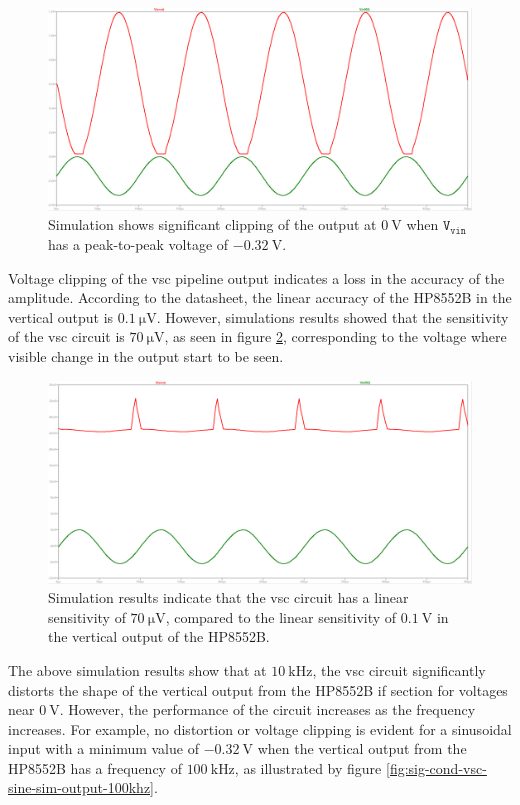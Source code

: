 \documentclass[class=report,11pt,crop=false]{standalone}
\begin{document}
	\begin{figure}[h!]
		\centering
		\includegraphics[width=0.7\linewidth]{Figures/Methodology/sig-cond-vsc-sine-sim-output-0-32Vpp}
		\caption{Simulation shows significant clipping of the output at $\SI{0}{\volt}$ when $\texttt{V}_\texttt{vin}$ has a peak-to-peak voltage of $-\SI{0.32}{\volt}$.}
		\label{fig:sig-cond-vsc-sine-sim-0-16Vpp}
	\end{figure}  

	Voltage clipping of the \acrshort{vsc} pipeline output indicates a loss in the accuracy of the amplitude. According to the datasheet, the linear accuracy of the HP8552B in the vertical output is $\SI{0.1}{\micro\volt}$. However, simulations results showed that the sensitivity of the \acrshort{vsc} circuit is $\SI{70}{\micro\volt}$, as seen in figure \ref{fig:sig-cond-vsc-sine-sim-output-0024Vpp}, corresponding to the voltage where visible change in the output start to be seen. 
	
	\begin{figure}[h!]
		\centering
		\includegraphics[width=0.7\linewidth]{Figures/Methodology/sig-cond-vsc-sine-sim-output-0042Vpp}
		\caption{Simulation results indicate that the \acrshort{vsc} circuit has a linear sensitivity of $\SI{70}{\micro\volt}$, compared to the linear sensitivity of $\SI{0.1}{\volt}$ in the vertical output of the HP8552B.}
		\label{fig:sig-cond-vsc-sine-sim-output-0024Vpp}
	\end{figure}  

	The above simulation results show that at $\SI{10}{\kilo\hertz}$, the \acrshort{vsc} circuit significantly distorts the shape of the vertical output from the HP8552B \acrshort{if} section for voltages near $\SI{0}{\volt}$. However, the performance of the circuit increases as the frequency increases. For example, no distortion or voltage clipping is evident for a sinusoidal input with a minimum value of $-\SI{0.32}{\volt}$ when the vertical output from the HP8552B has a frequency of $\SI{100}{\kilo\hertz}$, as illustrated by figure \ref{fig:sig-cond-vsc-sine-sim-output-100khz}.
	
\end{document}
